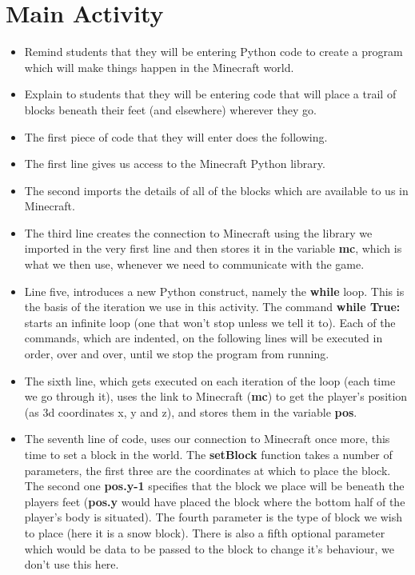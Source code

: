 \documentclass{geocraft-lesson-plan}
\begin{document}
\section*{Main Activity}
\begin{itemize}
\item Remind students that they will be entering Python code to create a program which will make things happen in the
  Minecraft world.
\item Explain to students that they will be entering code that will place a trail of blocks beneath their feet (and
  elsewhere) wherever they go.
\item The first piece of code that they will enter does the following.
\item The first line gives us access to the Minecraft Python library.
\item The second imports the details of all of the blocks which are available to us in Minecraft.
\item The third line creates the connection to Minecraft using the library we imported in the very first line and then
  stores it in the variable \textbf{mc}, which is what we then use, whenever we need to communicate with the game.
\item Line five, introduces a new Python construct, namely the \textbf{while} loop. This is the basis of the iteration
  we use in this activity. The command \textbf{while True:} starts an infinite loop (one that won't stop unless we tell
  it to). Each of the commands, which are indented, on the following lines will be executed in order, over and over, until
  we stop the program from running.
\item The sixth line, which gets executed on each iteration of the loop (each time we go through it), uses the link to
  Minecraft (\textbf{mc}) to get the player's position (as 3d coordinates x, y and z), and stores them in the variable
  \textbf{pos}.
\item The seventh line of code, uses our connection to Minecraft once more, this time to set a block in the world. The
  \textbf{setBlock} function takes a number of parameters, the first three are the coordinates at which to place the
  block. The second one \textbf{pos.y-1} specifies that the block we place will be beneath the players feet
  (\textbf{pos.y} would have placed the block where the bottom half of the player's body is situated). The fourth
  parameter is the type of block we wish to place (here it is a snow block). There is also a fifth optional parameter
  which would be data to be passed to the block to change it's behaviour, we don't use this here.

\end{itemize}
\end{document}
